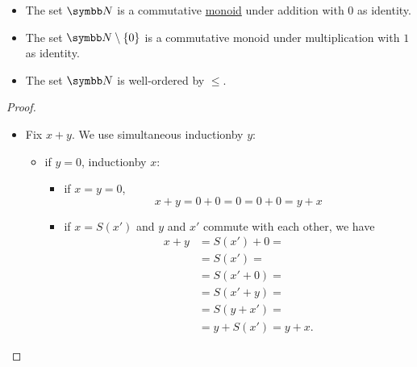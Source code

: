 \begin{definition}\label{def:natural_numbers}
  \begin{itemize}\mbox{}
    \item The set \( \BN \) is a commutative \hyperref[def:magma]{monoid} under addition with \( 0 \) as identity.
    \item The set \( \BN \setminus \{ 0 \} \) is a commutative monoid under multiplication with \( 1 \) as identity.
    \item The set \( \BN \) is well-ordered by \( \leq \).
  \end{itemize}
\end{definition}
\begin{proof}
  \begin{itemize}\mbox{}
    \item Fix \( x + y \). We use simultaneous induction\IND by \( y \):
          \begin{itemize}
            \item if \( y = 0 \), induction\IND by \( x \):
                  \begin{itemize}
                    \item if \( x = y = 0 \),
                          \begin{equation*}
                            x + y = 0 + 0 = 0 = 0 + 0 = y + x
                          \end{equation*}

                    \item if \( x = S(x') \) and \( y \) and \( x' \) commute with each other, we have
                          \begin{align*}
                            x + y
                             & =
                            S(x') + 0
                            =    \\ &=
                            S(x')
                            =    \\ &=
                            S(x' + 0)
                            =    \\ &=
                            S(x' + y)
                            =    \\ &=
                            S(y + x')
                            =    \\ &=
                            y + S(x')
                            =
                            y + x.
                          \end{align*}
                  \end{itemize}


\end{itemize}
\end{itemize}
\end{proof}
